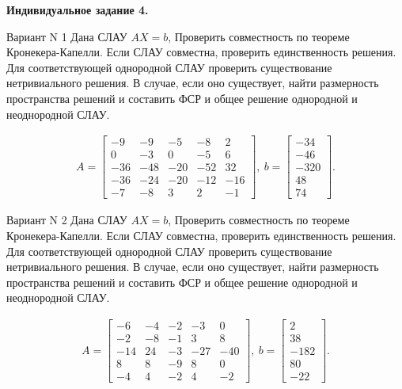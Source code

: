 \documentclass[11pt]{report}
\begin{document}
\pagestyle{empty}

{\bf Индивидуальное задание 4.}

Вариант N 1
Дана СЛАУ $AX = b$,
Проверить совместность по теореме Кронекера-Капелли. Если СЛАУ совместна, проверить единственность решения.
Для соответствующей однородной СЛАУ проверить существование нетривиального решения. В случае, если оно существует,
найти размерность пространства решений и составить ФСР и общее решение однородной  и неоднородной СЛАУ.


\begin{align*}
 A = \left[\begin{matrix}-9 & -9 & -5 & -8 & 2\\0 & -3 & 0 & -5 & 6\\-36 & -48 & -20 & -52 & 32\\-36 & -24 & -20 & -12 & -16\\-7 & -8 & 3 & 2 & -1\end{matrix}\right],
\ b = \left[\begin{matrix}-34\\-46\\-320\\48\\74\end{matrix}\right]. 
 \end{align*}

Вариант N 2
Дана СЛАУ $AX = b$,
Проверить совместность по теореме Кронекера-Капелли. Если СЛАУ совместна, проверить единственность решения.
Для соответствующей однородной СЛАУ проверить существование нетривиального решения. В случае, если оно существует,
найти размерность пространства решений и составить ФСР и общее решение однородной  и неоднородной СЛАУ.


\begin{align*}
 A = \left[\begin{matrix}-6 & -4 & -2 & -3 & 0\\-2 & -8 & -1 & 3 & 8\\-14 & 24 & -3 & -27 & -40\\8 & 8 & -9 & 8 & 0\\-4 & 4 & -2 & 4 & -2\end{matrix}\right],
\ b = \left[\begin{matrix}2\\38\\-182\\80\\-22\end{matrix}\right]. 
 \end{align*}
\end{document}
